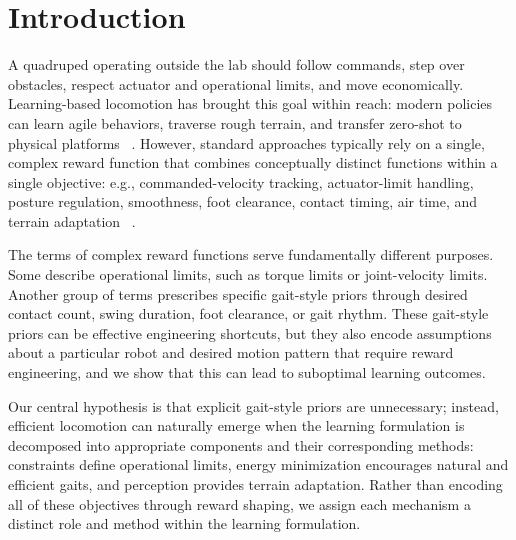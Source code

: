 \documentclass{article}
\begin{document}
    
    \section{Introduction}
    \label{sec:introduction}
    A quadruped operating outside the lab should follow commands, step over obstacles, respect actuator and operational limits, and move economically. Learning-based locomotion has brought this goal within reach: modern policies can learn agile behaviors, traverse rough terrain, and transfer zero-shot to physical platforms ~\citep{rudinLearningWalkMinutes2022a,margolisWalkTheseWays2023,mikiLearningRobustPerceptive2022,chane-saneCaTConstraintsTerminations2024a}. However, standard approaches typically rely on a single, complex reward function that combines conceptually distinct functions within a single objective: e.g., commanded-velocity tracking, actuator-limit handling, posture regulation, smoothness, foot clearance, contact timing, air time, and terrain adaptation ~\citep{rudinLearningWalkMinutes2022a,margolisWalkTheseWays2023,leeLearningQuadrupedalLocomotion2020,zhuangRobotParkourLearning2023}.

    The terms of complex reward functions serve fundamentally different purposes. Some describe operational limits, such as torque limits or joint-velocity limits. Another group of terms prescribes specific gait-style priors through desired contact count, swing duration, foot clearance, or gait rhythm. These gait-style priors can be effective engineering shortcuts, but they also encode assumptions about a particular robot and desired motion pattern that require reward engineering, and we show that this can lead to suboptimal learning outcomes.

    Our central hypothesis is that explicit gait-style priors are unnecessary; instead, efficient locomotion can naturally emerge when the learning formulation is decomposed into appropriate components and their corresponding methods: constraints define operational limits, energy minimization encourages natural and efficient gaits, and perception provides terrain adaptation. Rather than encoding all of these objectives through reward shaping, we assign each mechanism a distinct role and method within the learning formulation.
    
\end{document}
